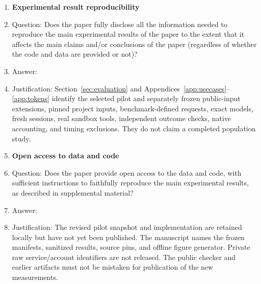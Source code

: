 \begin{enumerate}
\item {\bf Experimental result reproducibility}
    \item[] Question: Does the paper fully disclose all the information needed to reproduce the main experimental results of the paper to the extent that it affects the main claims and/or conclusions of the paper (regardless of whether the code and data are provided or not)?
    \item[] Answer: \answerYes{}
    \item[] Justification: Section~\ref{sec:evaluation} and Appendices~\ref{app:usecases}--\ref{app:tokens} identify the selected pilot and separately frozen public-input extensions, pinned project inputs, benchmark-defined requests, exact models, fresh sessions, real sandbox tools, independent outcome checks, native accounting, and timing exclusions. They do not claim a completed population study.

\item {\bf Open access to data and code}
    \item[] Question: Does the paper provide open access to the data and code, with sufficient instructions to faithfully reproduce the main experimental results, as described in supplemental material?
    \item[] Answer: \answerNo{}
    \item[] Justification: The revised pilot snapshot and implementation are retained locally but have not yet been published. The manuscript names the frozen manifests, sanitized results, source pins, and offline figure generator. Private raw service/account identifiers are not released. The public checker and earlier artifacts must not be mistaken for publication of the new measurements.


\end{enumerate}
